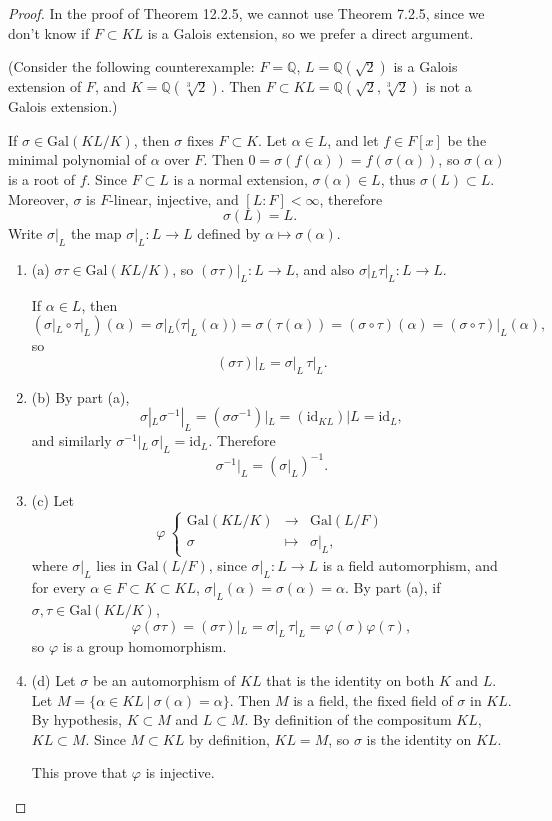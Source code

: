 \documentclass[11pt,a4paper]{article}
\newcommand{\be} {\begin{enumerate}}
\newcommand{\ee} {\end{enumerate}}
\newcommand{\Q}{\mathbb{Q}}
\newcommand{\Gal}{\mathrm{Gal}}
\begin{document}
\begin{proof}
In the proof of Theorem 12.2.5, we cannot use Theorem 7.2.5, since we don't know if $F \subset KL$ is a Galois extension, so we prefer a direct argument. 

(Consider the following counterexample: $F = \Q$,  $L = \Q(\sqrt{2})$ is a Galois extension of $F$, and $K =\Q(\sqrt[3]{2})$. Then $F \subset KL = \Q(\sqrt{2},\sqrt[3]{2})$ is not a Galois extension.)

If $\sigma \in \Gal(KL/K)$, then $\sigma$ fixes $F \subset K$. Let $\alpha \in L$, and let $f \in F[x]$ be the minimal polynomial of $\alpha$ over $F$. Then $0 = \sigma(f(\alpha)) = f(\sigma(\alpha))$, so $\sigma(\alpha)$ is a root of $f$. Since $F \subset L$ is a normal extension, $\sigma(\alpha) \in L$, thus $\sigma(L) \subset L$. Moreover, $\sigma$ is $F$-linear, injective, and $[L:F] < \infty$, therefore $$\sigma(L) = L.$$
Write $\sigma|_L $ the map $\sigma|_L : L \to L$ defined by $ \alpha \mapsto \sigma(\alpha)$.

\be
\item[(a)] $\sigma \tau \in \Gal(KL/K)$, so $(\sigma \tau)|_L : L \to L$, and also $\sigma|_L \tau|_L : L \to L$.

If $\alpha \in L$, then 
$$(\sigma|_L \circ \tau|_L)(\alpha) = \sigma|_L(\tau|_L(\alpha)) = \sigma(\tau(\alpha)) = (\sigma \circ \tau)(\alpha) =  (\sigma \circ \tau)|_L(\alpha),$$
so $$(\sigma \tau)|_L = \sigma|_L\, \tau|_L.$$

\item[(b)] By part (a), $$\sigma|_L \sigma^{-1}|_L = (\sigma \sigma^{-1})|_L = (\mathrm{id}_{KL})|L = \mathrm{id}_L,$$ and similarly $ \sigma^{-1}|_L\, \sigma|_L =  \mathrm{id}_L$. Therefore
$$\sigma^{-1}|_L = (\sigma|_L)^{-1}.$$

\item[(c)] Let
$$
\varphi\ 
\left\{
\begin{array}{ccc}
 \Gal(KL/K) & \to  & \Gal(L/F)   \\
  \sigma &\mapsto   &    \sigma|_L ,
\end{array}
\right.
$$
where $\sigma|_L$ lies in $\Gal(L/F)$, since $\sigma|_L : L \to L$ is a field automorphism, and for every $\alpha \in F \subset K \subset KL$, $\sigma|_L(\alpha) = \sigma(\alpha) = \alpha$.
By part (a), if $\sigma, \tau \in \Gal(KL/K)$,
$$\varphi(\sigma \tau) = (\sigma \tau)|_L = \sigma|_L\,  \tau|_L = \varphi(\sigma) \varphi(\tau),$$
so $\varphi$ is a group homomorphism.

\item[(d)]  Let $\sigma$ be an automorphism of $KL$ that is the identity on both $K$ and $L$.
Let $M = \{\alpha \in KL\ | \ \sigma(\alpha) = \alpha\}$. Then $M$ is a field, the fixed field of $\sigma$ in $KL$. By hypothesis,  $K \subset M$ and $L \subset M$. By definition of the compositum $KL$, $KL \subset M$. Since $M \subset KL$ by definition, $KL = M$, so $\sigma$ is the identity on $KL$.

This prove that $\varphi$ is injective.
\ee
\end{proof}
\end{document}
